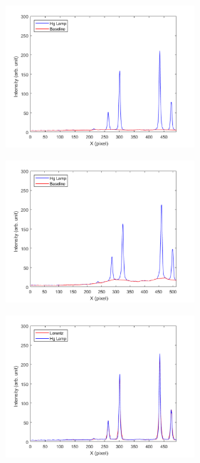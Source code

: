 \begin{figure}[H]
	\vspace{0.8cm}
	\centering
	\begin{subfigure}[fig nice]{0.49\textwidth}
		\includegraphics[width=7cm]{figures/nice_hg_base.png}
		\caption{}
		\label{fig:a11}
	\end{subfigure}
	\begin{subfigure}[fig nice]{0.49\textwidth}
		\includegraphics[width=7cm]{figures/badbase_hg_base.png}
		\caption{}
		\label{fig:b12}
	\end{subfigure}
\begin{subfigure}[fig nice]{0.49\textwidth}
	\includegraphics[width=7cm]{figures/nice_hg_lorentz.png}
	\caption{}
	\label{fig:a13}
\end{subfigure}
\begin{subfigure}[fig nice]{0.49\textwidth}

\end{subfigure}
\end{figure}
